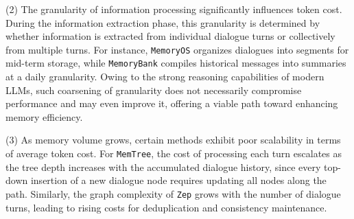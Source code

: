 
(2) The granularity of information processing significantly influences token cost. During the information extraction phase, this granularity is determined by whether information is extracted from individual dialogue turns or collectively from multiple turns. For instance, {\tt MemoryOS} organizes dialogues into segments for mid-term storage, while {\tt MemoryBank} compiles historical messages into summaries at a daily granularity. Owing to the strong reasoning capabilities of modern LLMs, such coarsening of granularity does not necessarily compromise performance and may even improve it, offering a viable path toward enhancing memory efficiency.


(3) As memory volume grows, certain methods exhibit poor scalability in terms of average token cost. For {\tt MemTree}, the cost of processing each turn escalates as the tree depth increases with the accumulated dialogue history, since every top-down insertion of a new dialogue node requires updating all nodes along the path. Similarly, the graph complexity of {\tt Zep} grows with the number of dialogue turns, leading to rising costs for deduplication and consistency maintenance.





